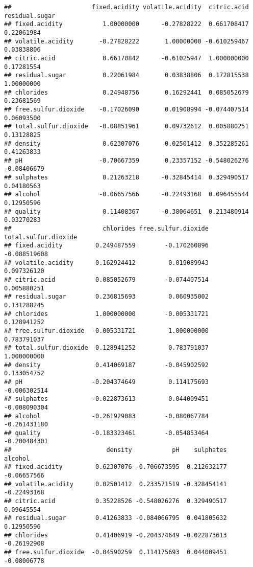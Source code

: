 \documentclass[
]{article}
\begin{document}
\begin{verbatim}
##                      fixed.acidity volatile.acidity  citric.acid residual.sugar
## fixed.acidity           1.00000000      -0.27828222  0.661708417     0.22061984
## volatile.acidity       -0.27828222       1.00000000 -0.610259467     0.03838806
## citric.acid             0.66170842      -0.61025947  1.000000000     0.17281554
## residual.sugar          0.22061984       0.03838806  0.172815538     1.00000000
## chlorides               0.24948756       0.16292441  0.085052679     0.23681569
## free.sulfur.dioxide    -0.17026090       0.01908994 -0.074407514     0.06093500
## total.sulfur.dioxide   -0.08851961       0.09732612  0.005880251     0.13128825
## density                 0.62307076       0.02501412  0.352285261     0.41263833
## pH                     -0.70667359       0.23357152 -0.548026276    -0.08406679
## sulphates               0.21263218      -0.32845414  0.329490517     0.04180563
## alcohol                -0.06657566      -0.22493168  0.096455544     0.12950596
## quality                 0.11408367      -0.38064651  0.213480914     0.03270283
##                         chlorides free.sulfur.dioxide total.sulfur.dioxide
## fixed.acidity         0.249487559        -0.170260896         -0.088519608
## volatile.acidity      0.162924412         0.019089943          0.097326120
## citric.acid           0.085052679        -0.074407514          0.005880251
## residual.sugar        0.236815693         0.060935002          0.131288245
## chlorides             1.000000000        -0.005331721          0.128941252
## free.sulfur.dioxide  -0.005331721         1.000000000          0.783791037
## total.sulfur.dioxide  0.128941252         0.783791037          1.000000000
## density               0.414069187        -0.045902592          0.133054752
## pH                   -0.204374649         0.114175693         -0.006302514
## sulphates            -0.022873613         0.044009451         -0.008090304
## alcohol              -0.261929083        -0.080067784         -0.261431180
## quality              -0.183323461        -0.054853464         -0.200484301
##                          density           pH    sulphates     alcohol
## fixed.acidity         0.62307076 -0.706673595  0.212632177 -0.06657566
## volatile.acidity      0.02501412  0.233571519 -0.328454141 -0.22493168
## citric.acid           0.35228526 -0.548026276  0.329490517  0.09645554
## residual.sugar        0.41263833 -0.084066795  0.041805632  0.12950596
## chlorides             0.41406919 -0.204374649 -0.022873613 -0.26192908
## free.sulfur.dioxide  -0.04590259  0.114175693  0.044009451 -0.08006778

\end{verbatim}
\end{document}

